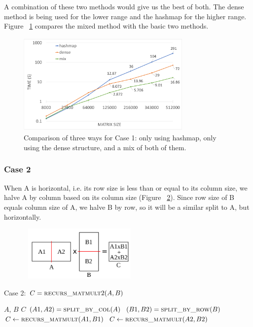 A combination of these two methods would give us the best of both. The dense method is being used for the lower range and the hashmap for the higher range. Figure ~\ref{fig:mix} compares the mixed method with the basic two methods.

\begin{figure}[tbh]
 \centering
 \includegraphics[width=8.5cm,height=5cm]{./figures/mix.pdf}
 \caption{Comparison of three ways for Case 1: only using hashmap, only using the dense structure, and a mix of both of them.}
 \label{fig:mix}
\end{figure}


\subsubsection{Case 2}
\label{sec:case2}
When A is horizontal, i.e. its row size is less than or equal to its column size, we halve A by column based on its column size (Figure ~\ref{fig:case2}). Since row size of B equals column size of A, we halve B by row, so it will be a similar split to A, but horizontally. 

\begin{figure}[tbh]
 \centering
 \includegraphics[width=6cm,height=2.7cm]{./figures/case2_001.pdf}
 \caption{}
 \label{fig:case2}
\end{figure}

\begin{algorithm}[H] 
  \caption{Case 2: $C = \textsc{recurs\_matmult}2(A, B)$} \label{alg:case2} 
  \begin{algorithmic}[1]
    \Require $A$, $B$
    \Ensure  $C$
    \State $(A1, A2) = \textsc{split\_by\_col}(A)$
    \State $(B1, B2) = \textsc{split\_by\_row}(B)$
    \State $C \leftarrow \textsc{recurs\_matmult}(A1,B1)$
    \State $C \leftarrow \textsc{recurs\_matmult}(A2,B2)$
  \end{algorithmic}
\end{algorithm}

